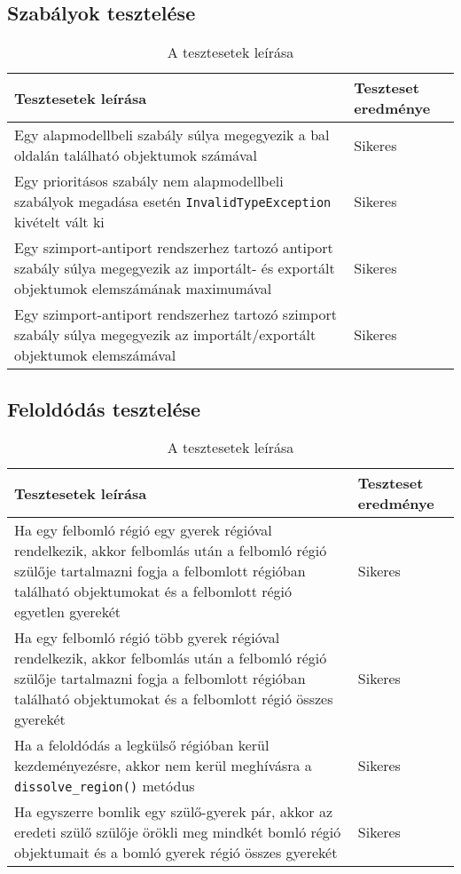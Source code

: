 \subsection{Szabályok tesztelése}


\begin{table}[H]
	\centering
	\begin{tabular}{ | m{} | m{} | }
		\hline
		\textbf{Tesztesetek leírása} & \textbf{Teszteset eredménye} \\
		\hline \hline
		Egy alapmodellbeli szabály súlya megegyezik a bal oldalán található objektumok számával & Sikeres \\
		\hline
		
	  Egy prioritásos szabály nem alapmodellbeli szabályok megadása esetén \verb|InvalidTypeException| kivételt vált ki & Sikeres \\
		\hline
		
				Egy szimport-antiport rendszerhez tartozó antiport szabály súlya megegyezik az importált- és exportált objektumok elemszámának maximumával & Sikeres \\
		\hline
		
						Egy szimport-antiport rendszerhez tartozó szimport szabály súlya megegyezik az importált/exportált objektumok elemszámával & Sikeres \\
		\hline
	\end{tabular}
	\caption{A tesztesetek leírása}
	\label{tab:test_cases_rules}
\end{table}

\subsection{Feloldódás tesztelése}

\begin{table}[H]
	\centering
	\begin{tabular}{ | m{} | m{} | }
		\hline
		\textbf{Tesztesetek leírása} & \textbf{Teszteset eredménye} \\
		\hline \hline
		Ha egy felbomló régió egy gyerek régióval rendelkezik, akkor felbomlás után a felbomló régió szülője tartalmazni fogja a felbomlott régióban található objektumokat és a felbomlott régió egyetlen gyerekét & Sikeres \\
		\hline
		Ha egy felbomló régió több gyerek régióval rendelkezik, akkor felbomlás után a felbomló régió szülője tartalmazni fogja a felbomlott régióban található objektumokat és a felbomlott régió összes gyerekét & Sikeres \\
		\hline
		Ha a feloldódás a legkülső régióban kerül kezdeményezésre, akkor nem kerül meghívásra a \verb|dissolve_region()| metódus & Sikeres \\
		\hline
		
		Ha egyszerre bomlik egy szülő-gyerek pár, akkor az eredeti szülő szülője örökli meg mindkét bomló régió objektumait és a bomló gyerek régió összes gyerekét & Sikeres \\
		\hline
	\end{tabular}
	\caption{A tesztesetek leírása}
	\label{tab:test_cases_dissolve}
\end{table}


